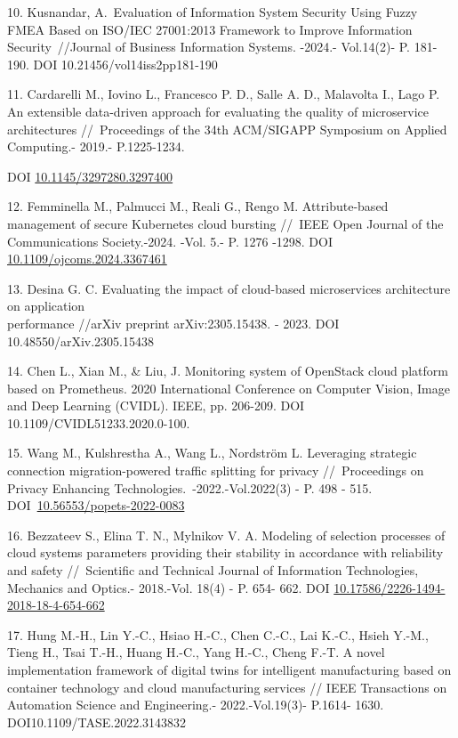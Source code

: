 \begin{references}
10. Kusnandar, A.~Evaluation of Information System Security Using Fuzzy
FMEA Based on ISO/IEC 27001:2013 Framework to Improve Information
Security~//Journal of Business Information Systems. -2024.- Vol.14(2)-
P. 181- 190. DOI 10.21456/vol14iss2pp181-190

11. Cardarelli M., Iovino L., Francesco P. D., Salle A. D., Malavolta
I., Lago P. An extensible data-driven approach for evaluating the
quality of microservice architectures //~Proceedings of the 34th
ACM/SIGAPP Symposium on Applied Computing.- 2019.- P.1225-1234.

DOI
\href{https://doi.org/10.1145/3297280.3297400}{10.1145/3297280.3297400}

12. Femminella M., Palmucci M., Reali G., Rengo M. Attribute-based
management of secure Kubernetes cloud bursting //~IEEE Open Journal of
the Communications Society.-2024. -Vol. 5.- P. 1276 -1298. DOI
\href{https://doi.org/10.1109/ojcoms.2024.3367461}{10.1109/ojcoms.2024.3367461}

13. Desina G. C. Evaluating the impact of cloud-based microservices
architecture on application \\performance //arXiv preprint
arXiv:2305.15438. - 2023. DOI 10.48550/arXiv.2305.15438

14. Chen L., Xian M., \& Liu, J. Monitoring system of OpenStack cloud
platform based on Prometheus. 2020 International Conference on Computer
Vision, Image and Deep Learning (CVIDL). IEEE, pp. 206-209. DOI
10.1109/CVIDL51233.2020.0-100.

15. Wang M., Kulshrestha A., Wang L., Nordström L. Leveraging strategic
connection migration-powered traffic splitting for privacy
//~Proceedings on Privacy Enhancing Technologies.~-2022.-Vol.2022(3) -
P. 498 - 515.
DOI~\href{https://doi.org/10.56553/popets-2022-0083}{10.56553/popets-2022-0083}

16. Bezzateev S., Elina T. N., Mylnikov V. A. Modeling of selection
processes of cloud systems parameters providing their stability in
accordance with reliability and safety //~Scientific and Technical
Journal of Information Technologies, Mechanics and Optics.- 2018.-Vol.
18(4) - P. 654- 662. DOI
\href{https://doi.org/10.17586/2226-1494-2018-18-4-654-662}{10.17586/2226-1494-2018-18-4-654-662}

17. Hung M.-H., Lin Y.-C., Hsiao H.-C., Chen C.-C., Lai K.-C., Hsieh
Y.-M., Tieng H., Tsai T.-H., Huang H.-C., Yang H.-C., Cheng F.-T. A
novel implementation framework of digital twins for intelligent
manufacturing based on container technology and cloud manufacturing
services // IEEE Transactions on Automation Science and Engineering.-
2022.-Vol.19(3)- P.1614- 1630. DOI10.1109/TASE.2022.3143832


\end{references}
